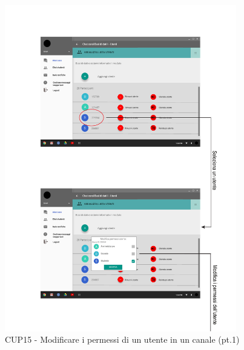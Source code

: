\begin{figure}
	\centering
	\includegraphics[width=0.9\textwidth]{imgs/gruppo6/activities/act_cup15_modifica_permessi_utente1.pdf}
	\caption{CUP15 - Modificare i permessi di un utente in un canale (pt.1)}
	\label{fig:cup15-2}
\end{figure}

